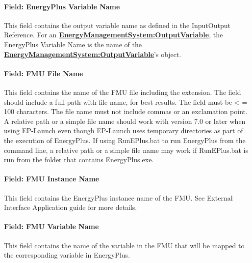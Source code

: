\paragraph{Field: EnergyPlus Variable Name}\label{field-energyplus-variable-name}

This field contains the output variable name as defined in the InputOutput Reference. For an \textbf{\hyperref[energymanagementsystemoutputvariable]{EnergyManagementSystem:OutputVariable}}, the EnergyPlus Variable Name is the name of the \textbf{\hyperref[energymanagementsystemoutputvariable]{EnergyManagementSystem:OutputVariable}}'s object.

\paragraph{Field: FMU File Name}\label{field-fmu-file-name-1}

This field contains the name of the FMU file including the extension. The field should include a full path with file name, for best results. The field must be \textless{} = 100 characters. The file name must not include commas or an exclamation point. A relative path or a simple file name should work with version 7.0 or later when using EP-Launch even though EP-Launch uses temporary directories as part of the execution of EnergyPlus. If using RunEPlus.bat to run EnergyPlus from the command line, a relative path or a simple file name may work if RunEPlus.bat is run from the folder that contains EnergyPlus.exe.

\paragraph{Field: FMU Instance Name}\label{field-fmu-instance-name}

This field contains the EnergyPlus instance name of the FMU. See External Interface Application guide for more details.

\paragraph{Field: FMU Variable Name}\label{field-fmu-variable-name}

This field contains the name of the variable in the FMU that will be mapped to the corresponding variable in EnergyPlus.

